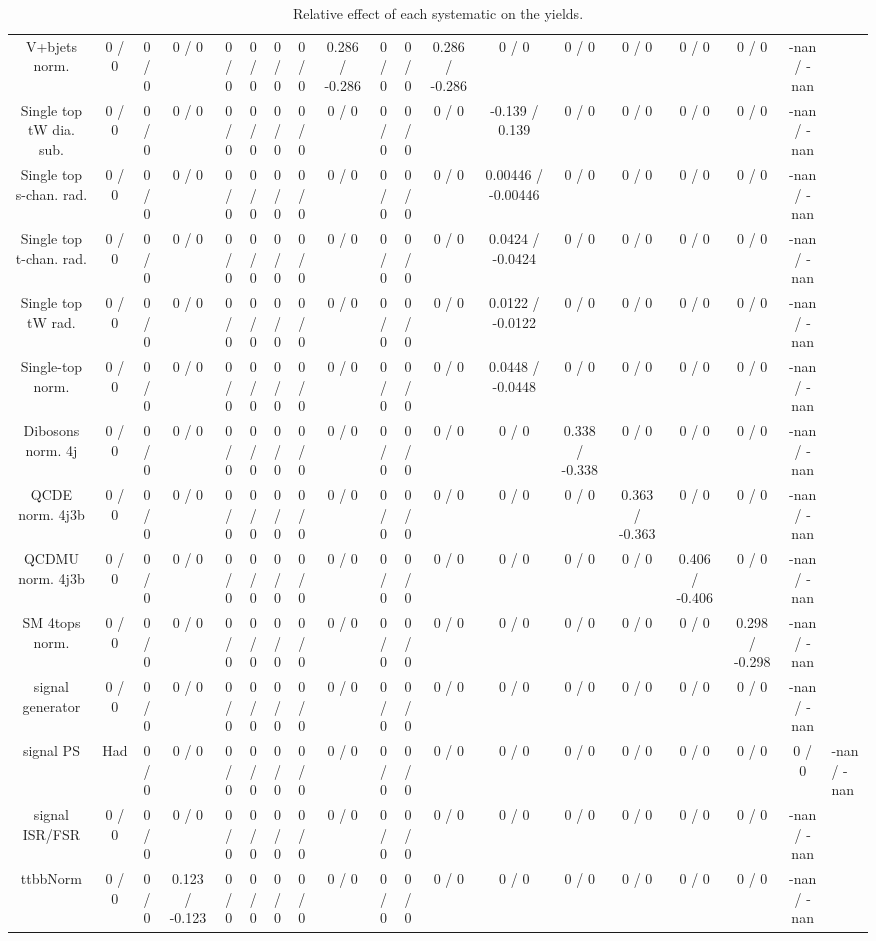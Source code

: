 \documentclass[10pt]{article}
\begin{document}
\begin{table}[htbp]
\begin{center}
\begin{tabular}{|c|c|c|c|c|c|c|c|c|c|c|c|c|c|c|c|c|c|}
  V+bjets norm. & 0 / 0 & 0 / 0 & 0 / 0 & 0 / 0 & 0 / 0 & 0 / 0 & 0 / 0 & 0.286 / -0.286 & 0 / 0 & 0 / 0 & 0.286 / -0.286 & 0 / 0 & 0 / 0 & 0 / 0 & 0 / 0 & 0 / 0 & -nan / -nan \\ 
  Single top tW dia. sub. & 0 / 0 & 0 / 0 & 0 / 0 & 0 / 0 & 0 / 0 & 0 / 0 & 0 / 0 & 0 / 0 & 0 / 0 & 0 / 0 & 0 / 0 & -0.139 / 0.139 & 0 / 0 & 0 / 0 & 0 / 0 & 0 / 0 & -nan / -nan \\ 
  Single top s-chan. rad. & 0 / 0 & 0 / 0 & 0 / 0 & 0 / 0 & 0 / 0 & 0 / 0 & 0 / 0 & 0 / 0 & 0 / 0 & 0 / 0 & 0 / 0 & 0.00446 / -0.00446 & 0 / 0 & 0 / 0 & 0 / 0 & 0 / 0 & -nan / -nan \\ 
  Single top t-chan. rad. & 0 / 0 & 0 / 0 & 0 / 0 & 0 / 0 & 0 / 0 & 0 / 0 & 0 / 0 & 0 / 0 & 0 / 0 & 0 / 0 & 0 / 0 & 0.0424 / -0.0424 & 0 / 0 & 0 / 0 & 0 / 0 & 0 / 0 & -nan / -nan \\ 
  Single top tW rad. & 0 / 0 & 0 / 0 & 0 / 0 & 0 / 0 & 0 / 0 & 0 / 0 & 0 / 0 & 0 / 0 & 0 / 0 & 0 / 0 & 0 / 0 & 0.0122 / -0.0122 & 0 / 0 & 0 / 0 & 0 / 0 & 0 / 0 & -nan / -nan \\ 
  Single-top norm. & 0 / 0 & 0 / 0 & 0 / 0 & 0 / 0 & 0 / 0 & 0 / 0 & 0 / 0 & 0 / 0 & 0 / 0 & 0 / 0 & 0 / 0 & 0.0448 / -0.0448 & 0 / 0 & 0 / 0 & 0 / 0 & 0 / 0 & -nan / -nan \\ 
  Dibosons norm. 4j & 0 / 0 & 0 / 0 & 0 / 0 & 0 / 0 & 0 / 0 & 0 / 0 & 0 / 0 & 0 / 0 & 0 / 0 & 0 / 0 & 0 / 0 & 0 / 0 & 0.338 / -0.338 & 0 / 0 & 0 / 0 & 0 / 0 & -nan / -nan \\ 
  QCDE norm. 4j3b & 0 / 0 & 0 / 0 & 0 / 0 & 0 / 0 & 0 / 0 & 0 / 0 & 0 / 0 & 0 / 0 & 0 / 0 & 0 / 0 & 0 / 0 & 0 / 0 & 0 / 0 & 0.363 / -0.363 & 0 / 0 & 0 / 0 & -nan / -nan \\ 
  QCDMU norm. 4j3b & 0 / 0 & 0 / 0 & 0 / 0 & 0 / 0 & 0 / 0 & 0 / 0 & 0 / 0 & 0 / 0 & 0 / 0 & 0 / 0 & 0 / 0 & 0 / 0 & 0 / 0 & 0 / 0 & 0.406 / -0.406 & 0 / 0 & -nan / -nan \\ 
  SM 4tops norm. & 0 / 0 & 0 / 0 & 0 / 0 & 0 / 0 & 0 / 0 & 0 / 0 & 0 / 0 & 0 / 0 & 0 / 0 & 0 / 0 & 0 / 0 & 0 / 0 & 0 / 0 & 0 / 0 & 0 / 0 & 0.298 / -0.298 & -nan / -nan \\ 
  signal generator & 0 / 0 & 0 / 0 & 0 / 0 & 0 / 0 & 0 / 0 & 0 / 0 & 0 / 0 & 0 / 0 & 0 / 0 & 0 / 0 & 0 / 0 & 0 / 0 & 0 / 0 & 0 / 0 & 0 / 0 & 0 / 0 & -nan / -nan \\ 
  signal PS & Had & 0 / 0 & 0 / 0 & 0 / 0 & 0 / 0 & 0 / 0 & 0 / 0 & 0 / 0 & 0 / 0 & 0 / 0 & 0 / 0 & 0 / 0 & 0 / 0 & 0 / 0 & 0 / 0 & 0 / 0 & 0 / 0 & -nan / -nan \\ 
  signal ISR/FSR & 0 / 0 & 0 / 0 & 0 / 0 & 0 / 0 & 0 / 0 & 0 / 0 & 0 / 0 & 0 / 0 & 0 / 0 & 0 / 0 & 0 / 0 & 0 / 0 & 0 / 0 & 0 / 0 & 0 / 0 & 0 / 0 & -nan / -nan \\ 
 ttbbNorm & 0 / 0 & 0 / 0 & 0.123 / -0.123 & 0 / 0 & 0 / 0 & 0 / 0 & 0 / 0 & 0 / 0 & 0 / 0 & 0 / 0 & 0 / 0 & 0 / 0 & 0 / 0 & 0 / 0 & 0 / 0 & 0 / 0 & -nan / -nan \\ 
\hline 
\end{tabular} 
\caption{Relative effect of each systematic on the yields.} 
\end{center} 
\end{table} 
\end{document}
